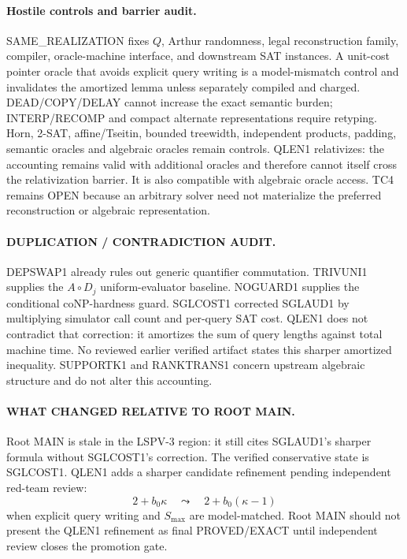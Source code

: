 \documentclass[11pt]{article}
\begin{document}
\paragraph{Hostile controls and barrier audit.}
SAME\_REALIZATION fixes \(Q\), Arthur randomness, legal reconstruction family, compiler, oracle-machine interface, and downstream SAT instances. A unit-cost pointer oracle that avoids explicit query writing is a model-mismatch control and invalidates the amortized lemma unless separately compiled and charged. DEAD/COPY/DELAY cannot increase the exact semantic burden; INTERP/RECOMP and compact alternate representations require retyping. Horn, 2-SAT, affine/Tseitin, bounded treewidth, independent products, padding, semantic oracles and algebraic oracles remain controls. QLEN1 relativizes: the accounting remains valid with additional oracles and therefore cannot itself cross the relativization barrier. It is also compatible with algebraic oracle access. TC4 remains OPEN because an arbitrary solver need not materialize the preferred reconstruction or algebraic representation.

\paragraph{DUPLICATION / CONTRADICTION AUDIT.}
DEPSWAP1 already rules out generic quantifier commutation. TRIVUNI1 supplies the \(A\circ D_j\) uniform-evaluator baseline. NOGUARD1 supplies the conditional coNP-hardness guard. SGLCOST1 corrected SGLAUD1 by multiplying simulator call count and per-query SAT cost. QLEN1 does not contradict that correction: it amortizes the sum of query lengths against total machine time. No reviewed earlier verified artifact states this sharper amortized inequality. SUPPORTK1 and RANKTRANS1 concern upstream algebraic structure and do not alter this accounting.

\paragraph{WHAT CHANGED RELATIVE TO ROOT MAIN.}
Root MAIN is stale in the LSPV-3 region: it still cites SGLAUD1's sharper formula without SGLCOST1's correction. The verified conservative state is SGLCOST1. QLEN1 adds a sharper candidate refinement pending independent red-team review:
\[
2+b_0\kappa
\quad\leadsto\quad
2+b_0(\kappa-1)
\]
when explicit query writing and \(S_{\max}\) are model-matched. Root MAIN should not present the QLEN1 refinement as final PROVED/EXACT until independent review closes the promotion gate.
\end{document}
